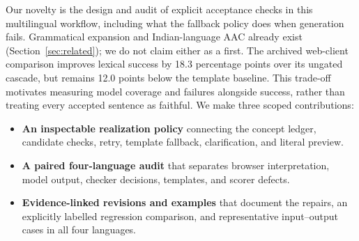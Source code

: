 Our novelty is the design and audit of explicit acceptance checks in this multilingual workflow, including what the fallback policy does when generation fails.
Grammatical expansion and Indian-language AAC already exist (Section~\ref{sec:related}); we do not claim either as a first.
The archived web-client comparison improves lexical success by 18.3 percentage points over its ungated cascade, but remains 12.0 points below the template baseline.
This trade-off motivates measuring model coverage and failures alongside success, rather than treating every accepted sentence as faithful.
We make three scoped contributions:
\begin{itemize}
\item \textbf{An inspectable realization policy} connecting the concept ledger, candidate checks, retry, template fallback, clarification, and literal preview.
\item \textbf{A paired four-language audit} that separates browser interpretation, model output, checker decisions, templates, and scorer defects.
\item \textbf{Evidence-linked revisions and examples} that document the repairs, an explicitly labelled regression comparison, and representative input--output cases in all four languages.
\end{itemize}

